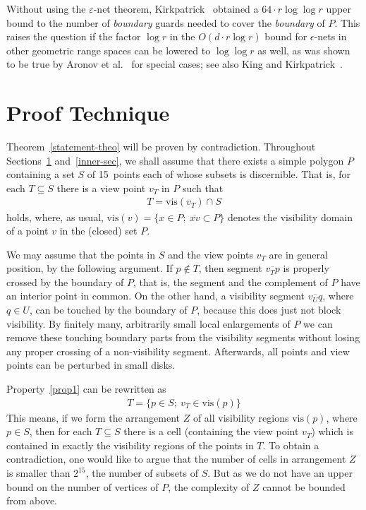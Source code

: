 \documentclass[11pt]{article}
\begin{document}
Without using the $\varepsilon$-net theorem, Kirkpatrick~\cite{k-ggnn-00} obtained a $64\cdot r \log \log r$ upper
bound to the number of {\em boundary} guards needed to cover the {\em boundary} of $P$. This raises the question 
if the factor $\log r$ in the $O(d\cdot r \log r)$ bound for $\epsilon$-nets in other geometric range spaces 
can be lowered to $\log \log r$ as well, as was shown to be true by Aronov et al.~\cite{bes-ssena-10} for 
special cases; see also King and Kirkpatrick~\cite{kk-iagsgp-10}. 




\bigskip



\section{Proof Technique}         \label{technique-sec}

Theorem~\ref{statement-theo} will be proven by contradiction. 
Throughout Sections~\ref{technique-sec} and~\ref{inner-sec}, we shall assume that there exists a simple
polygon $P$ containing a set $S$ of 15~points each of whose subsets is discernible.
That is, for each $T \subseteq S$ there is a view point $v_T$ in $P$ such that 
\begin{eqnarray}                            \label{prop1}
     T =   \mbox{vis}(v_T) \cap S 
\end{eqnarray}
holds, where, as usual,
   $  \mbox{vis}(v) = \{ x \in P;  \ \overline{xv} \subset P\} $
denotes the visibility domain of a point $v$ in the (closed) set $P$. 

We may assume that the points in $S$ and the view points $v_T$ are in general position,
by the following argument. If $p \notin T$,
then segment $\overline{v_Tp}$ is properly crossed by the boundary of $P$, that is, the segment and the complement
of $P$ have an interior point in common. On the other hand,
a visibility segment $\overline{v_Uq}$, where $q \in U$, can be touched by the boundary of $P$, because
this does just not block visibility. By finitely many, arbitrarily small local enlargements of $P$ we can remove
these touching boundary parts from the visibility segments without losing any proper crossing of a non-visibility segment.
Afterwards, all points and view points can be perturbed in small disks.

Property~\ref{prop1} can be rewritten as
\begin{eqnarray}                            \label{prop2}
        T=\{ p \in S; \ v_T \in \mbox{vis}(p)\}
\end{eqnarray}
This means, if we form the arrangement $Z$ of all visibility regions $\mbox{vis}(p)$, where $p \in S$,
then for each $T \subseteq S$ there is a cell (containing the view point $v_T$) which is contained
in exactly the visibility regions of the points in $T$.
To obtain a contradiction, one would like to argue that the number of cells in 
arrangement $Z$ is smaller than $2^{15}$, the number of subsets of $S$. But as we do not have
an upper bound on the number of vertices of $P$,  the complexity of $Z$ cannot be bounded from above.
\end{document}
